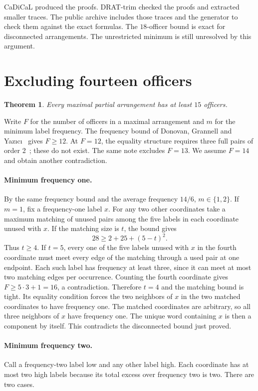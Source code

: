 \documentclass[11pt]{article}
\newtheorem{theorem}{Theorem}
\begin{document}
CaDiCaL produced the proofs. DRAT-trim checked the proofs and
extracted smaller traces. The public archive includes those traces
and the generator to check them against the exact formulas.
The \(18\)-officer bound is exact for disconnected arrangements.
The unrestricted minimum is still unresolved by this argument.

\section{Excluding fourteen officers}

\begin{theorem}
Every maximal partial arrangement has at least \(15\) officers.
\end{theorem}

Write \(F\) for the number of officers in a maximal arrangement and
\(m\) for the minimum label frequency. The frequency bound of
Donovan, Grannell and Yaz\i c\i~\cite[Eq.~(1)]{dgy2} gives \(F\ge12\).
At \(F=12\), the equality structure requires three full pairs of
order 2~\cite{gap}; these do not exist. The same note excludes
\(F=13\). We assume \(F=14\) and obtain another contradiction.

\paragraph{Minimum frequency one.} By the same frequency bound and
the average frequency \(14/6\), \(m\in\{1,2\}\). If \(m=1\),
fix a frequency-one label \(x\). For any two other coordinates
take a maximum matching of unused pairs among the five labels in
each coordinate unused with \(x\). If the matching size is \(t\),
the bound gives
\[
28\ge 2+25+(5-t)^2.
\]
Thus \(t\ge4\). If \(t=5\), every one of the five labels unused
with \(x\) in the fourth coordinate must meet every edge of the
matching through a used pair at one endpoint. Each such label
has frequency at least three, since it can meet at most two
matching edges per occurrence. Counting the fourth coordinate
gives \(F\ge 5\cdot3+1=16\), a contradiction. Therefore \(t=4\)
and the matching bound is tight. Its equality condition forces
the two neighbors of \(x\) in the two matched coordinates to
have frequency one. The matched coordinates are arbitrary, so
all three neighbors of \(x\) have frequency one. The unique word
containing \(x\) is then a component by itself. This contradicts
the disconnected bound just proved.

\paragraph{Minimum frequency two.} Call a frequency-two label
low and any other label high. Each coordinate has at most two
high labels because its total excess over frequency two is two.
There are two cases.
\end{document}
